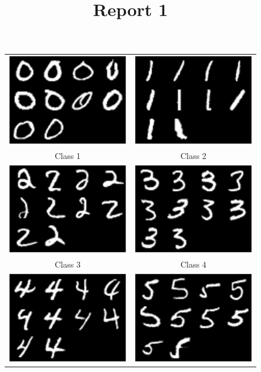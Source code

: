 \documentclass{article}
\title{Report 1}
\begin{document}
\begin{figure}[!htb]
\centering
\begin{tabular}{cc}
\includegraphics[width=55mm]{task1_1_imgs_class1.eps} &   \includegraphics[width=55mm]{task1_1_imgs_class2.eps} \\
Class 1 & Class 2 \\[6pt]
 \includegraphics[width=55mm]{task1_1_imgs_class3.eps} &   \includegraphics[width=55mm]{task1_1_imgs_class4.eps} \\
     Class 3 & Class 4 \\[6pt]
\includegraphics[width=55mm]{task1_1_imgs_class5.eps} &   \includegraphics[width=55mm]{task1_1_imgs_class6.eps} \\

\end{tabular}
\end{figure}
\end{document}
